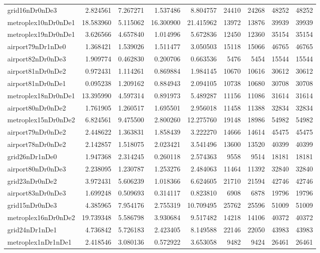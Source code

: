 \begin{longtable}{|l|r|r|r|r|r|r|r|r|}
grid16nDr0nDe3 & 2.824561 & 7.267271 & 1.537486 & 8.804757 & 24410 & 24268 & 48252 & 48252 \\
metroplex10nDr0nDe1 & 18.583960 & 5.115062 & 16.300900 & 21.415962 & 13972 & 13876 & 39939 & 39939 \\
metroplex19nDr0nDe1 & 3.626566 & 4.657840 & 1.014996 & 5.672836 & 12450 & 12360 & 35154 & 35154 \\
airport79nDr1nDe0 & 1.368421 & 1.539026 & 1.511477 & 3.050503 & 15118 & 15066 & 46765 & 46765 \\
airport82nDr0nDe3 & 1.909774 & 0.462830 & 0.200706 & 0.663536 & 5476 & 5454 & 15544 & 15544 \\
airport81nDr0nDe2 & 0.972431 & 1.114261 & 0.869884 & 1.984145 & 10670 & 10616 & 30612 & 30612 \\
airport81nDr0nDe1 & 0.095238 & 1.209162 & 0.884943 & 2.094105 & 10738 & 10680 & 30708 & 30708 \\
metroplex18nDr0nDe1 & 13.395990 & 4.597314 & 0.891973 & 5.489287 & 11156 & 11086 & 31614 & 31614 \\
airport80nDr0nDe2 & 1.761905 & 1.260517 & 1.695501 & 2.956018 & 11458 & 11388 & 32834 & 32834 \\
metroplex15nDr0nDe2 & 6.824561 & 9.475500 & 2.800260 & 12.275760 & 19148 & 18986 & 54982 & 54982 \\
airport79nDr0nDe2 & 2.448622 & 1.363831 & 1.858439 & 3.222270 & 14666 & 14614 & 45475 & 45475 \\
airport78nDr0nDe2 & 2.142857 & 1.518075 & 2.023421 & 3.541496 & 13600 & 13520 & 40399 & 40399 \\
grid26nDr1nDe0 & 1.947368 & 2.314245 & 0.260118 & 2.574363 & 9558 & 9514 & 18181 & 18181 \\
airport80nDr0nDe3 & 2.238095 & 1.230787 & 1.253276 & 2.484063 & 11464 & 11392 & 32840 & 32840 \\
grid23nDr0nDe2 & 3.972431 & 5.606239 & 1.018366 & 6.624605 & 21710 & 21594 & 42746 & 42746 \\
airport83nDr0nDe3 & 1.699248 & 0.509693 & 0.314117 & 0.823810 & 6908 & 6878 & 19796 & 19796 \\
grid15nDr0nDe3 & 4.385965 & 7.954176 & 2.755319 & 10.709495 & 25762 & 25596 & 51009 & 51009 \\
metroplex16nDr0nDe2 & 19.739348 & 5.586798 & 3.930684 & 9.517482 & 14218 & 14106 & 40372 & 40372 \\
grid24nDr1nDe1 & 4.736842 & 5.726183 & 2.423405 & 8.149588 & 22146 & 22050 & 43983 & 43983 \\
metroplex1nDr1nDe1 & 2.418546 & 3.080136 & 0.572922 & 3.653058 & 9482 & 9424 & 26461 & 26461 \\

\end{longtable}
